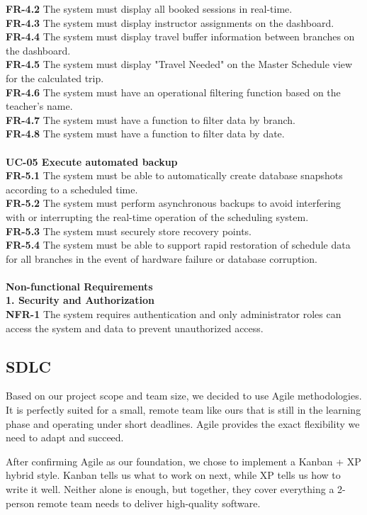 \textbf{FR-4.2} The system must display all booked sessions in real-time. \\
\textbf{FR-4.3} The system must display instructor assignments on the dashboard. \\
\textbf{FR-4.4} The system must display travel buffer information between branches on the dashboard. \\
\textbf{FR-4.5} The system must display "Travel Needed" on the Master Schedule view for the calculated trip. \\
\textbf{FR-4.6} The system must have an operational filtering function based on the teacher's name. \\
\textbf{FR-4.7} The system must have a function to filter data by branch. \\
\textbf{FR-4.8} The system must have a function to filter data by date. \\
\\
\textbf{UC-05 Execute automated backup} \\
\textbf{FR-5.1} The system must be able to automatically create database snapshots according to a scheduled time. \\
\textbf{FR-5.2} The system must perform asynchronous backups to avoid interfering with or interrupting the real-time operation of the scheduling system. \\
\textbf{FR-5.3} The system must securely store recovery points. \\
\textbf{FR-5.4} The system must be able to support rapid restoration of schedule data for all branches in the event of hardware failure or database corruption. \\
\\
\textbf{Non-functional Requirements}\\
\textbf{1. Security and Authorization} \\
\textbf{NFR-1} The system requires authentication and only administrator roles can access the system and data to prevent unauthorized access.
\subsection{SDLC}
Based on our project scope and team size, we decided to use Agile methodologies. It is perfectly suited for a small, remote team like ours that is still in the learning phase and operating under short deadlines. Agile provides the exact flexibility we need to adapt and succeed.

After confirming Agile as our foundation, we chose to implement a Kanban + XP hybrid style. Kanban tells us what to work on next, while XP tells us how to write it well. Neither alone is enough, but together, they cover everything a 2-person remote team needs to deliver high-quality software.

